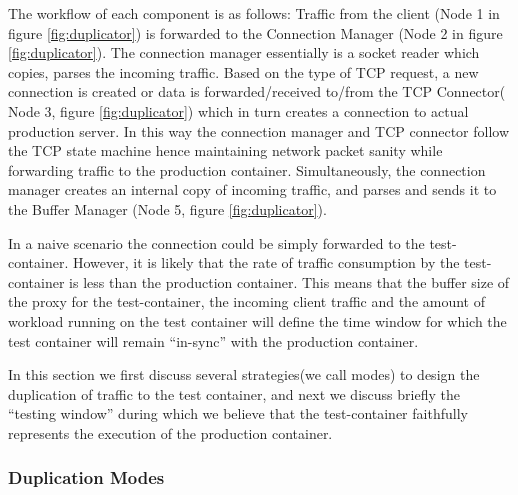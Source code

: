 The workflow of each component is as follows: Traffic from the client (Node 1 in figure \ref{fig:duplicator}) is forwarded to the Connection Manager (Node 2 in figure \ref{fig:duplicator}). 
The connection manager essentially is a socket reader which copies, parses the incoming traffic. 
Based on the type of TCP request, a new connection is created or data is forwarded/received to/from the TCP Connector( Node 3, figure \ref{fig:duplicator}) which in turn creates a connection to actual production server.
In this way the connection manager and TCP connector follow the TCP state machine hence maintaining network packet sanity while forwarding traffic to the production container.
Simultaneously, the connection manager creates an internal copy of incoming traffic, and parses and sends it to the Buffer Manager (Node 5, figure \ref{fig:duplicator}).
\fi

In a naive scenario the connection could be simply forwarded to the test-container. 
However, it is likely that the rate of traffic consumption by the test-container is less than the production container. 
This means that the buffer size of the proxy for the test-container, the incoming client traffic and the amount of workload running on the test container will define the time window for which the test container will remain ``in-sync'' with the production container.

In this section we first discuss several strategies(we call modes) to design the duplication of traffic to the test container, and next we discuss briefly the ``testing window'' during which we believe that the test-container faithfully represents the execution of the production container. 



\subsubsection{Duplication Modes}
\label{sec:dupMode}

